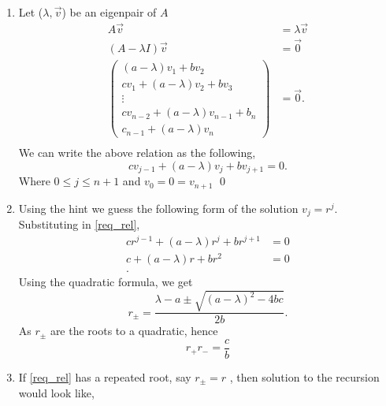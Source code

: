 \documentclass{report}
\begin{document}
\begin{solution}
	\begin{enumerate}[label=(\alph*)]
		\item Let ($\lambda, \vec{v}$) be an eigenpair of $A$
		      \begin{align*}
			      A\vec{v}                                 & =   \lambda \vec{v} \\
			      \left( A - \lambda I \right)\vec{v}      & = \vec{0} \\
			      \left(\begin{array}{ccccc}
					            \left( a-\lambda \right) v_1 + bv_2   \\
					            cv_1 + (a-\lambda)v_2 + bv_3          \\
					            \vdots                                \\
					            cv_{n-2} + (a-\lambda) v_{n-1}+ b_{n} \\
					            c_{n-1} + (a-\lambda) v_{n}
				            \end{array}   \right) & = \vec{0} . \\
		      \end{align*}
		      We can write the above relation as the following,
		      \begin{equation}
			      cv_{j-1} + \left( a-\lambda \right) v_{j} + bv_{j+1} = 0  \label{req_rel}
			      . \end{equation}
		      Where  $0\le j \le n+1$ and $v_{0} = 0 = v_{n+1}$
		      \qed
		\item Using the hint we guess the following form of the solution $v_{j} = r^j$. Substituting in \ref{req_rel},
		      \begin{align*}
			      cr^{j-1} + \left( a-\lambda \right) r^{j} + br^{j+1} & =   0 \\
			      c + \left( a-\lambda \right) r + br^{2}              & =   0 \\
			      .\end{align*}
		      Using the quadratic formula, we get
		      \[
			      r_{\pm} = \frac{\lambda -a \pm \sqrt{(a-\lambda)^2 - 4bc} }{ 2b}.
		      \]
		      As $r_{\pm}$ are the roots to a quadratic, hence
		      \begin{equation}
			      r_{+}r_{-} = \dfrac{c}{b} \label{prod_rs}
		      \end{equation}
		\item If \ref{req_rel} has a repeated root, say $r_{\pm} = r $ , then solution to the recursion would look like,

\end{enumerate}
\end{solution}
\end{document}
